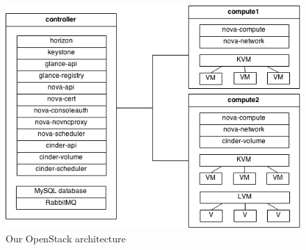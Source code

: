 \begin{figure}[h]
	\centering
	\includegraphics[scale=0.6]{figures/os_arch.png}
	\caption{Our OpenStack architecture}
	\label{fig:os_arch}
\end{figure}

